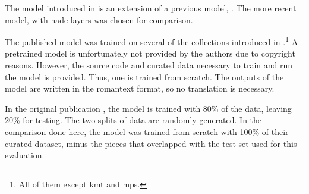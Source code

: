 
The model introduced in \textcite{micchi2021deep} is an
extension of a previous model, \textcite{micchi2020not}. The
more recent model, with \gls{nade} layers was chosen for
comparison.

The published model was trained on several of the
collections introduced in
.\footnote{All of
them except \gls{kmt} and \gls{mps}.} A pretrained model is
unfortunately not provided by the authors due to copyright
reasons. However, the source code and curated data necessary
to train and run the model is provided. Thus, one is trained
from scratch. The outputs of the model are written in the
\gls{romantext} format, so no translation is necessary. 

In the original publication \parencite{micchi2021deep}, the
model is trained with 80\% of the data, leaving 20\% for
testing. The two splits of data are randomly generated. In
the comparison done here, the model was trained from scratch
with 100\% of their curated dataset, minus the pieces that
overlapped with the test set used for this evaluation.
